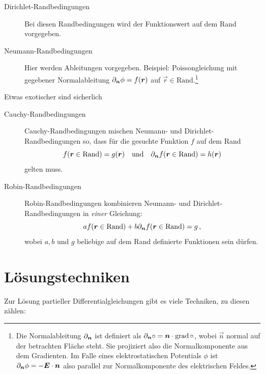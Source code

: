\documentclass[paper=a4, fontsize=11.0pt, abstractoff, DIV12]{scrartcl}
\begin{document}
\begin{description}
    \item[Dirichlet-Randbedingungen]
    Bei diesen Randbedingungen wird der Funktionswert auf dem Rand vorgegeben.
    \item[Neumann-Randbedingungen]
    Hier werden Ableitungen vorgegeben. Beispiel: Poissongleichung mit gegebener
    Normalableitung $\partial_{{\boldsymbol{n}}} \phi = f({\boldsymbol{r}})$ auf $\vec r \in \text{Rand}$.\footnote{Die Normalableitung $\partial_{{\boldsymbol{n}}}$ ist definiert als $\partial_{{\boldsymbol{n}}} \circ = {\boldsymbol{n}} \cdot \operatorname{grad} \circ$, wobei $\vec n$ normal auf der betrachten Fläche steht.
    Sie projiziert also die Normalkomponente aus dem Gradienten. Im Falle eines
    elektrostatischen Potentials $\phi$ ist $\partial_{{\boldsymbol{n}}} \phi = -{\boldsymbol{E}} \cdot {\ensuremath{\boldsymbol{n}}}$
    also parallel zur Normalkomponente des elektrischen Feldes.}
\end{description}
Etwas exotischer sind sicherlich
\begin{description}
    \item[Cauchy-Randbedingungen]
    Cauchy-Randbedingungen mischen Neumann- und Dirichlet-Randbedingungen so,
    dass für die gesuchte Funktion $f$ auf dem Rand
    \[f({\boldsymbol{r}} \in \text{Rand}) = g({\boldsymbol{r}})\quad\text{und}\quad\partial_{{\boldsymbol{n}}} f({\boldsymbol{r}}\in \text{Rand}) = h({\boldsymbol{r}})\]
    gelten muss.
    \item[Robin-Randbedingungen]
    Robin-Randbedingungen kombinieren Neumann- und Dirichlet-Randbedingungen in
    \emph{einer} Gleichung:
    \[a f({\boldsymbol{r}} \in \text{Rand}) + b \partial_{{\boldsymbol{n}}} f({\boldsymbol{r}} \in \text{Rand}) = g\,,\]
    wobei $a, b$ und $g$ beliebige auf dem Rand definierte Funktionen sein dürfen.
    
\end{description}


\section{Lösungstechniken}

Zur Lösung partieller Differentialgleichungen gibt es viele Techniken, zu diesen zählen:
\end{document}
